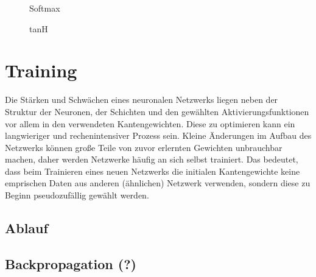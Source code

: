 \begin{figure}[H]
    \begin{minipage}{0.45\textwidth}
        \begin{center}
        \end{center}
        \caption{Softmax}
    \end{minipage}\hfill
    \begin{minipage}{0.45\textwidth}
        \begin{center}
        \end{center}
        \caption{tanH}
    \end{minipage}
\end{figure}

\section{Training}\label{sec:training}

Die Stärken und Schwächen eines neuronalen Netzwerks liegen neben der
Struktur der Neuronen, der Schichten und den gewählten Aktivierungsfunktionen
vor allem in den verwendeten Kantengewichten. Diese zu optimieren kann ein
langwieriger und rechenintensiver Prozess sein. Kleine Änderungen im Aufbau
des Netzwerks können große Teile von zuvor erlernten Gewichten unbrauchbar
machen, daher werden Netzwerke häufig an sich selbst trainiert.
Das bedeutet, dass beim Trainieren eines neuen Netzwerks die initialen
Kantengewichte keine emprischen Daten aus anderen (ähnlichen) Netzwerk verwenden,
sondern diese zu Beginn pseudozufällig gewählt werden.

\subsection{Ablauf}

\subsection{Backpropagation (?)}

